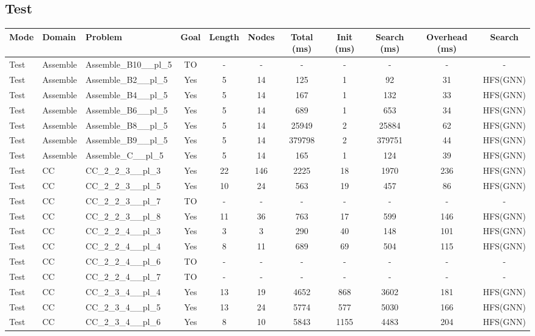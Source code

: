 \documentclass{article}
\begin{document}
\subsection*{Test}
\begin{tabular}{lllcccccccc}
\toprule
Mode & Domain & Problem & Goal & Length & Nodes & Total (ms) & Init (ms) & Search (ms) & Overhead (ms) & Search \\
\midrule
Test & Assemble & Assemble\_B10\_\_pl\_5 & TO & - & - & - & - & - & - & - \\
Test & Assemble & Assemble\_B2\_\_pl\_5 & Yes & 5 & 14 & 125 & 1 & 92 & 31 & HFS(GNN) \\
Test & Assemble & Assemble\_B4\_\_pl\_5 & Yes & 5 & 14 & 167 & 1 & 132 & 33 & HFS(GNN) \\
Test & Assemble & Assemble\_B6\_\_pl\_5 & Yes & 5 & 14 & 689 & 1 & 653 & 34 & HFS(GNN) \\
Test & Assemble & Assemble\_B8\_\_pl\_5 & Yes & 5 & 14 & 25949 & 2 & 25884 & 62 & HFS(GNN) \\
Test & Assemble & Assemble\_B9\_\_pl\_5 & Yes & 5 & 14 & 379798 & 2 & 379751 & 44 & HFS(GNN) \\
Test & Assemble & Assemble\_C\_\_pl\_5 & Yes & 5 & 14 & 165 & 1 & 124 & 39 & HFS(GNN) \\
Test & CC & CC\_2\_2\_3\_\_pl\_3 & Yes & 22 & 146 & 2225 & 18 & 1970 & 236 & HFS(GNN) \\
Test & CC & CC\_2\_2\_3\_\_pl\_5 & Yes & 10 & 24 & 563 & 19 & 457 & 86 & HFS(GNN) \\
Test & CC & CC\_2\_2\_3\_\_pl\_7 & TO & - & - & - & - & - & - & - \\
Test & CC & CC\_2\_2\_3\_\_pl\_8 & Yes & 11 & 36 & 763 & 17 & 599 & 146 & HFS(GNN) \\
Test & CC & CC\_2\_2\_4\_\_pl\_3 & Yes & 3 & 3 & 290 & 40 & 148 & 101 & HFS(GNN) \\
Test & CC & CC\_2\_2\_4\_\_pl\_4 & Yes & 8 & 11 & 689 & 69 & 504 & 115 & HFS(GNN) \\
Test & CC & CC\_2\_2\_4\_\_pl\_6 & TO & - & - & - & - & - & - & - \\
Test & CC & CC\_2\_2\_4\_\_pl\_7 & TO & - & - & - & - & - & - & - \\
Test & CC & CC\_2\_3\_4\_\_pl\_4 & Yes & 13 & 19 & 4652 & 868 & 3602 & 181 & HFS(GNN) \\
Test & CC & CC\_2\_3\_4\_\_pl\_5 & Yes & 13 & 24 & 5774 & 577 & 5030 & 166 & HFS(GNN) \\
Test & CC & CC\_2\_3\_4\_\_pl\_6 & Yes & 8 & 10 & 5843 & 1155 & 4483 & 204 & HFS(GNN) \\

\end{tabular}
\end{document}
